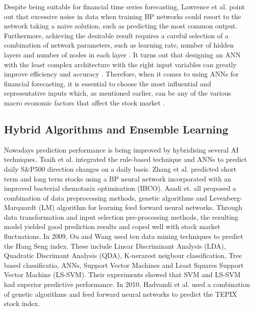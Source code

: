 \documentclass{UoYCSproject}
\begin{document}
Despite being suitable for financial time series forecasting, Lawrence et al. \cite{lawrence1998noisy} point out that excessive noise in data when training BP networks could resort to the network taking a naive solution, such as predicting the most common output. Furthermore, achieving the desirable result requires a careful selection of a combination of network parameters, such as learning rate, number of hidden layers and number of nodes in each layer \cite{hussain2008financial}. It turns out that designing an ANN with the least complex architecture with the right input variables can greatly improve efficiency and accuracy \cite{atsalakis2009surveying}. Therefore, when it comes to using ANNs for financial forecasting, it is essential to choose the most influential and representative inputs which, as mentioned earlier, can be any of the various macro economic factors that affect the stock market \cite{zhong2017forecasting}. 

\subsection{Hybrid Algorithms and Ensemble Learning}
Nowadays prediction performance is being improved by hybridising several AI techniques. Tsaih et al. \cite{tsaih1998forecasting} integrated the rule-based technique and ANNs to predict daily S\&P500 direction changes on a daily basis. Zhang et al. \cite{zhang2009stock} predicted short term and long term stocks using a BP neural network incorporated with an improved bacterial chemotasix optimisation (IBCO). Asadi et. all \cite{asadi2012hybridization} proposed a combination of data preprocessing methods, genetic algorithms and Levenberg-Marquardt (LM) algorithm for learning feed forward neural networks. Through data transformation and input selection pre-processing methods, the resulting model yielded good prediction results and coped well with stock market fluctuations. In 2009, Ou and Wang \cite{ou2009prediction} used ten data mining techniques to predict the Hang Seng index. These include Linear Discriminant Analysis (LDA), Quadratic Discrimant Analysis (QDA), K-nerarest neigbour classification, Tree based classificatio, ANNs, Support Vector Machines and Least Squares Support Vector Machine (LS-SVM). Their experiments showed that SVM and LS-SVM had superior predictive performance. In 2010, Hadvandi et al. \cite{hadavandi2010developing} used a combination of genetic algorithms and feed forward neural networks to predict the TEPIX stock index.
\end{document}

